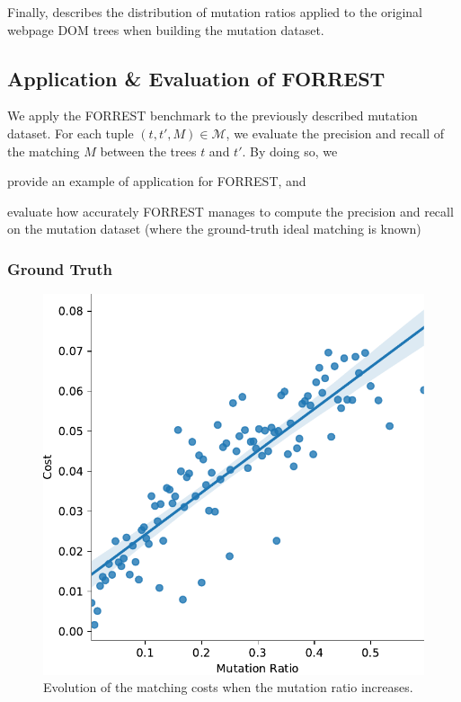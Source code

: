 \documentclass{vldb}
\begin{document}
Finally,  describes the distribution of mutation ratios applied to the original webpage DOM trees when building the mutation dataset.


\subsection{Application \& Evaluation of FORREST}
We apply the FORREST benchmark to the previously described mutation dataset.
For each tuple $(t, t', M) \in \mathscr{M}$, we evaluate the precision and recall of the matching $M$ between the trees $t$ and $t'$. 
By doing so, we
\begin{inparaenum}
    \item provide an example of application for FORREST, and
    \item evaluate how accurately FORREST manages to compute the precision and recall on the mutation dataset (where the ground-truth ideal matching is known)
\end{inparaenum}
 
\subsubsection{Ground Truth}

\begin{figure}
     \centering
     \includegraphics[width=\linewidth]{graphs/mutation_ratio_cost}
     \caption{Evolution of the matching costs when the mutation ratio increases.}
     \label{fig:mutation_ratio_vs_cost}
\end{figure}
\end{document}

